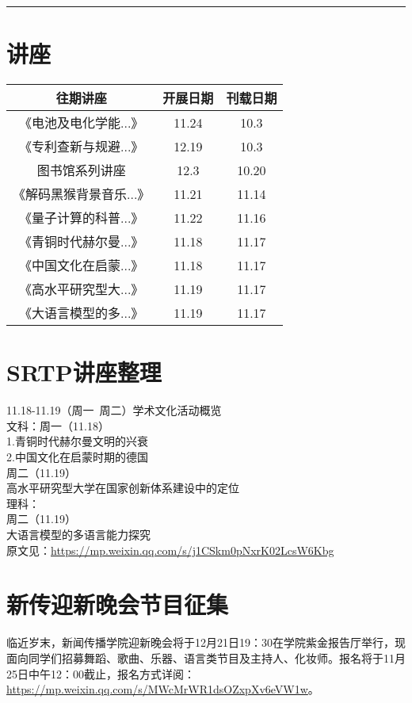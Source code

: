\documentclass[letterpaper, 12pt]{article}
\begin{document}
\hrule
\pagebreak
\begin{multicols}{2}

\section{讲座}
\begin{tabular}{|c|c|c|}
    \hline
    往期讲座 & 开展日期 & 刊载日期\\
    \hline\hline
    《电池及电化学能...》 & 11.24 & 10.3\\
    《专利查新与规避...》 & 12.19 & 10.3\\
    图书馆系列讲座 & 12.3 & 10.20\\
    《解码黑猴背景音乐...》 & 11.21 & 11.14\\
    《量子计算的科普...》 & 11.22 & 11.16\\
    《青铜时代赫尔曼...》 & 11.18 & 11.17\\
    《中国文化在启蒙...》 & 11.18 & 11.17\\
    《高水平研究型大...》 & 11.19 & 11.17\\
    《大语言模型的多...》 & 11.19 & 11.17\\
    \hline
\end{tabular}

\section{SRTP讲座整理}
11.18-11.19（周一~周二）学术文化活动概览\\
文科：周一（11.18）\\
1.青铜时代赫尔曼文明的兴衰\\
2.中国文化在启蒙时期的德国\\
周二（11.19）\\
高水平研究型大学在国家创新体系建设中的定位\\
理科：\\
周二（11.19）\\
大语言模型的多语言能力探究\\
原文见：\url{https://mp.weixin.qq.com/s/j1CSkm0pNxrK02LcsW6Kbg}

\section{新传迎新晚会节目征集}
临近岁末，新闻传播学院迎新晚会将于12月21日19：30在学院紫金报告厅举行，现面向同学们招募舞蹈、歌曲、乐器、语言类节目及主持人、化妆师。报名将于11月25日中午12：00截止，报名方式详阅：\url{https://mp.weixin.qq.com/s/MWcMrWR1dsOZxpXv6eVW1w}。

\end{multicols}
\end{document}
